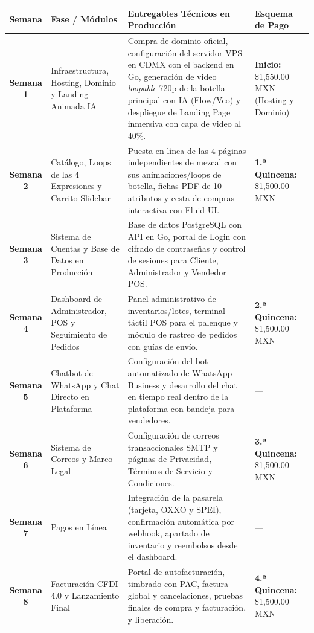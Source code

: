 \documentclass[11pt,letterpaper]{article}
\begin{document}
\begin{table}[H]
\centering
\small
\begin{tabularx}{\textwidth}{cp{4.4cm}Xp{3.0cm}}
\toprule
\rowcolor{MezcalAgave!15}
\textbf{Semana} & \textbf{Fase / Módulos} & \textbf{Entregables Técnicos en Producción} & \textbf{Esquema de Pago} \\
\midrule
\textbf{Semana 1} & Infraestructura, Hosting, Dominio y Landing Animada IA & Compra de dominio oficial, configuración del servidor VPS en CDMX con el backend en Go, generación de video \textit{loopable} 720p de la botella principal con IA (Flow/Veo) y despliegue de Landing Page inmersiva con capa de video al 40\%. & \textbf{Inicio:} \$1,550.00 MXN (Hosting y Dominio) \\
\midrule
\textbf{Semana 2} & Catálogo, Loops de las 4 Expresiones y Carrito Slidebar & Puesta en línea de las 4 páginas independientes de mezcal con sus animaciones/loops de botella, fichas PDF de 10 atributos y cesta de compras interactiva con Fluid UI. & \textbf{1.ª Quincena:} \$1,500.00 MXN \\
\midrule
\textbf{Semana 3} & Sistema de Cuentas y Base de Datos en Producción & Base de datos PostgreSQL con API en Go, portal de Login con cifrado de contraseñas y control de sesiones para Cliente, Administrador y Vendedor POS. & --- \\
\midrule
\textbf{Semana 4} & Dashboard de Administrador, POS y Seguimiento de Pedidos & Panel administrativo de inventarios/lotes, terminal táctil POS para el palenque y módulo de rastreo de pedidos con guías de envío. & \textbf{2.ª Quincena:} \$1,500.00 MXN \\
\midrule
\textbf{Semana 5} & Chatbot de WhatsApp y Chat Directo en Plataforma & Configuración del bot automatizado de WhatsApp Business y desarrollo del chat en tiempo real dentro de la plataforma con bandeja para vendedores. & --- \\
\midrule
\textbf{Semana 6} & Sistema de Correos y Marco Legal & Configuración de correos transaccionales SMTP y páginas de Privacidad, Términos de Servicio y Condiciones. & \textbf{3.ª Quincena:} \$1,500.00 MXN \\
\midrule
\textbf{Semana 7} & Pagos en Línea & Integración de la pasarela (tarjeta, OXXO y SPEI), confirmación automática por webhook, apartado de inventario y reembolsos desde el dashboard. & --- \\
\midrule
\textbf{Semana 8} & Facturación CFDI 4.0 y Lanzamiento Final & Portal de autofacturación, timbrado con PAC, factura global y cancelaciones, pruebas finales de compra y facturación, y liberación. & \textbf{4.ª Quincena:} \$1,500.00 MXN \\
\bottomrule
\end{tabularx}
\end{table}
\end{document}
